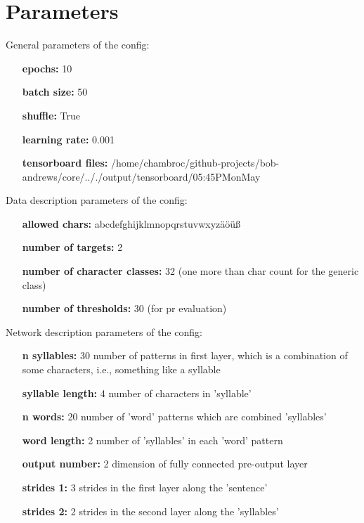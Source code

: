 \documentclass[a4paper,10pt,twoside]{article}
\begin{document}
 
\section{Parameters}

        General parameters of the config:
        

        \begin{itemize}
        \item[{\bf epochs:}] 10
        \item[{\bf batch size:}] 50
        \item[{\bf shuffle:}] True
        \item[{\bf learning rate:}] 0.001
        \item[{\bf tensorboard files:}] /home/chambroc/github-projects/bob-andrews/core/.././output/tensorboard/05:45PM\textunderscore on\textunderscore May
        \end{itemize}
        

        
        Data description parameters of the config:
        

        \begin{itemize}
        \item[{\bf allowed chars:}] abcdefghijklmnopqrstuvwxyzäöüß 
        \item[{\bf number of targets:}] 2
        \item[{\bf number of character classes:}] 32 (one more than char count for the generic class)
        \item[{\bf number of thresholds:}] 30 (for pr evaluation)
        \end{itemize}
        

        
        Network description parameters of the config:
        

        \begin{itemize}
        \item[{\bf n syllables:}] 30 number of patterns in first layer, which is a combination of some characters, i.e., something like a syllable
        \item[{\bf syllable length:}] 4 number of characters in 'syllable'
        \item[{\bf n words:}] 20 number of 'word' patterns which are combined 'syllables'
        \item[{\bf word length:}] 2 number of 'syllables' in each 'word' pattern
        \item[{\bf output number:}] 2 dimension of fully connected pre-output layer
        \item[{\bf strides 1:}] 3 strides in the first layer along the 'sentence'
        \item[{\bf strides 2:}] 2 strides in the second layer along the 'syllables'
        \end{itemize}
        
\end{document}
